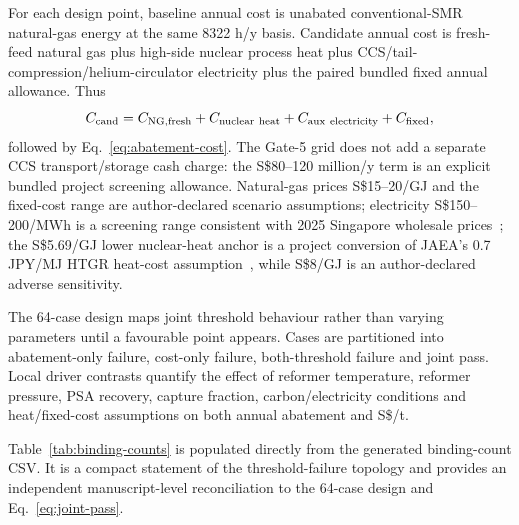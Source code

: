 For each design point, baseline annual cost is unabated conventional-SMR natural-gas energy at the same 8322 h/y basis. Candidate annual cost is fresh-feed natural gas plus high-side nuclear process heat plus CCS/tail-compression/helium-circulator electricity plus the paired bundled fixed annual allowance. Thus
\begin{equation}
C_{\rm cand}=C_{\rm NG,fresh}+C_{\rm nuclear\ heat}+C_{\rm aux\ electricity}+C_{\rm fixed},
\end{equation}
followed by Eq.~\eqref{eq:abatement-cost}. The Gate-5 grid does not add a separate CCS transport/storage cash charge: the S\$80--120 million/y term is an explicit bundled project screening allowance. Natural-gas prices S\$15--20/GJ and the fixed-cost range are author-declared scenario assumptions; electricity S\$150--200/MWh is a screening range consistent with 2025 Singapore wholesale prices~\cite{emaenergyprices}; the S\$5.69/GJ lower nuclear-heat anchor is a project conversion of JAEA's 0.7 JPY/MJ HTGR heat-cost assumption~\cite{jaea2014economics}, while S\$8/GJ is an author-declared adverse sensitivity.

The 64-case design maps joint threshold behaviour rather than varying parameters until a favourable point appears. Cases are partitioned into abatement-only failure, cost-only failure, both-threshold failure and joint pass. Local driver contrasts quantify the effect of reformer temperature, reformer pressure, PSA recovery, capture fraction, carbon/electricity conditions and heat/fixed-cost assumptions on both annual abatement and S\$/t.

Table~\ref{tab:binding-counts} is populated directly from the generated binding-count CSV. It is a compact statement of the threshold-failure topology and provides an independent manuscript-level reconciliation to the 64-case design and Eq.~\eqref{eq:joint-pass}.

\begin{table}[htbp]
\centering
\caption{Binding-constraint classification of the coupled Gate-5 nuclear-assisted cases. Counts are generated from the verified Rust model at build time.}
\label{tab:binding-counts}
\end{table}


